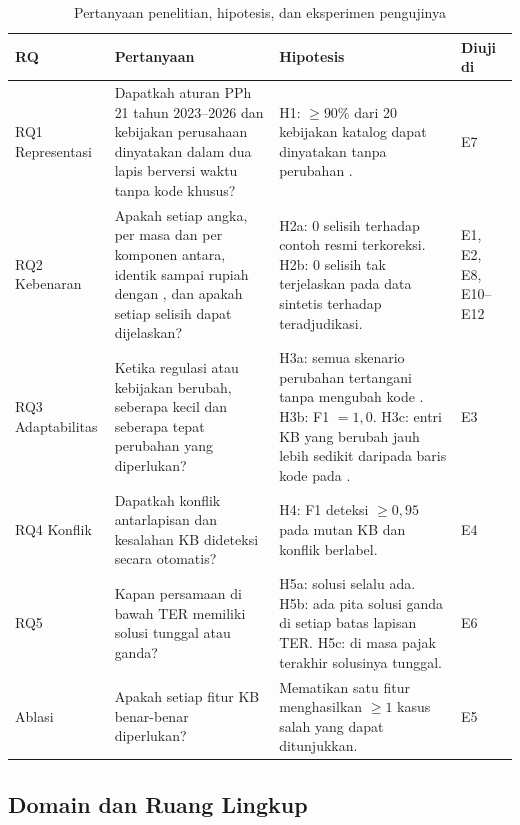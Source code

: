 \begin{table}[t]
\centering
\caption{Pertanyaan penelitian, hipotesis, dan eksperimen pengujinya}
\label{tab:rq}
\footnotesize
\begin{tabularx}{\textwidth}{@{}P{2.3cm} L L P{1.9cm}@{}}
\toprule
\textbf{RQ} & \textbf{Pertanyaan} & \textbf{Hipotesis} & \textbf{Diuji di} \\
\midrule
RQ1 Representasi & Dapatkah aturan PPh 21 tahun 2023--2026 dan kebijakan perusahaan dinyatakan dalam  dua lapis berversi waktu tanpa kode khusus? & H1: $\geq$90\% dari 20 kebijakan katalog dapat dinyatakan  tanpa perubahan . & E7 \\
RQ2 Kebenaran & Apakah setiap angka, per masa dan per komponen antara, identik sampai rupiah dengan , dan apakah setiap selisih dapat dijelaskan? & H2a: 0 selisih terhadap contoh resmi terkoreksi. H2b: 0 selisih tak terjelaskan pada data sintetis terhadap  teradjudikasi. & E1, E2, E8, E10--E12 \\
RQ3 Adaptabilitas & Ketika regulasi atau kebijakan berubah, seberapa kecil dan seberapa tepat perubahan yang diperlukan? & H3a: semua skenario perubahan tertangani tanpa mengubah kode . H3b:  F1 $=1{,}0$. H3c: entri KB yang berubah jauh lebih sedikit daripada baris kode pada . & E3 \\
RQ4 Konflik & Dapatkah konflik antarlapisan dan kesalahan KB dideteksi secara otomatis? & H4: F1 deteksi $\geq0{,}95$ pada mutan KB dan konflik berlabel. & E4 \\
RQ5  & Kapan persamaan  di bawah TER memiliki solusi tunggal atau ganda? & H5a: solusi selalu ada. H5b: ada pita solusi ganda di setiap batas lapisan TER. H5c: di masa pajak terakhir solusinya tunggal. & E6 \\
Ablasi & Apakah setiap fitur KB benar-benar diperlukan? & Mematikan satu fitur menghasilkan $\geq1$ kasus salah yang dapat ditunjukkan. & E5 \\
\bottomrule
\end{tabularx}
\end{table}

\subsection{Domain dan Ruang Lingkup}
\label{subsec:domain}

